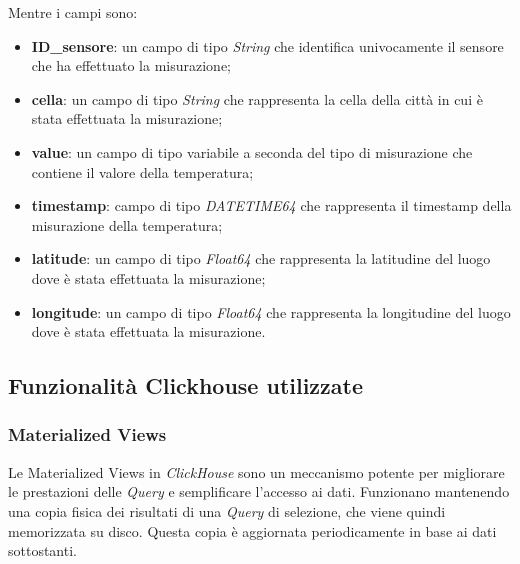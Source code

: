     Mentre i campi sono:
    \begin{itemize}
        \item \textbf{ID\_sensore}: un campo di tipo \textit{String} che identifica univocamente il sensore che ha effettuato la misurazione;
        \item \textbf{cella}: un campo di tipo \textit{String} che rappresenta la cella della città in cui è stata effettuata la misurazione;
        \item \textbf{value}: un campo di tipo variabile a seconda del tipo di misurazione che contiene il valore della temperatura;
        \item \textbf{timestamp}: campo di tipo \textit{DATETIME64} che rappresenta il timestamp della misurazione della temperatura;
        \item \textbf{latitude}: un campo di tipo \textit{Float64} che rappresenta la latitudine del luogo dove è stata effettuata la misurazione;
        \item \textbf{longitude}: un campo di tipo \textit{Float64} che rappresenta la longitudine del luogo dove è stata effettuata la misurazione.
    \end{itemize}

\subsection{Funzionalità Clickhouse utilizzate}
\subsubsection{Materialized Views}
Le Materialized Views in \textit{ClickHouse} sono un meccanismo potente per migliorare le prestazioni delle \textit{Query} e semplificare l'accesso ai dati. Funzionano mantenendo una copia fisica dei risultati di una \textit{Query} di selezione, che viene quindi memorizzata su disco. Questa copia è aggiornata periodicamente in base ai dati sottostanti.

